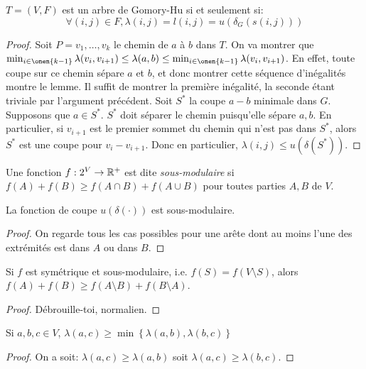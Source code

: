 \documentclass[math, info]{cours}
\begin{document}
\begin{lemme}
	$T = (V, F)$ est un arbre de Gomory-Hu si et seulement si:
	\begin{equation*}
		\forall(i, j) \in F, \lambda(i, j) = l(i, j) = u(\delta_{G}(s(i, j)))
	\end{equation*}
\end{lemme}
\begin{proof}
	Soit $P = v_{1},\ldots, v_{k}$ le chemin de $a$ à $b$ dans $T$.
	On va montrer que $\min_{i \in \onen{k-1}} \lambda(v_{i}, v_{i+1}) \leq \lambda(a, b) \leq \min_{i \in \onen{k - 1}}\lambda(v_{i}, v_{i + 1})$.
	En effet, toute coupe sur ce chemin sépare $a$ et $b$, et donc montrer cette séquence d'inégalités montre le lemme.
	Il suffit de montrer la première inégalité, la seconde étant triviale par l'argument précédent.
	Soit $S^{*}$ la coupe $a-b$ minimale dans $G$. Supposons que $a \in S^{*}$.
	$S^{*}$ doit séparer le chemin puisqu'elle sépare $a, b$. En particulier, si $v_{i + 1}$ est le premier sommet du chemin qui n'est pas dans $S^{*}$, alors $S^{*}$ est une coupe pour $v_{i} - v_{i + 1}$.
	Donc en particulier, $\lambda(i, j) \leq u(\delta(S^{*}))$.
\end{proof}

\begin{definition}
	Une fonction $f : 2^{V} \to \mathbb{R}^{+}$ est dite \emph{sous-modulaire} si $f(A) + f(B) \geq f(A \cap B) + f(A \cup B)$ pour toutes parties $A, B$ de $V$.
	\label{def:submodularfunction}
\end{definition}

\begin{lemme}
	La fonction de coupe $u(\delta(\cdot))$ est sous-modulaire.
\end{lemme}
\begin{proof}
	On regarde tous les cas possibles pour une arête dont au moins l'une des extrémités est dans $A$ ou dans $B$.
\end{proof}

\begin{lemme}
	Si $f$ est symétrique et sous-modulaire, i.e. $f(S) = f(V\setminus S)$, alors $f(A) + f(B) \geq f(A \setminus B) + f(B\setminus A)$.
\end{lemme}
\begin{proof}
	Débrouille-toi, normalien.
\end{proof}

\begin{lemme}
	Si $a, b, c\in V$, $\lambda(a, c) \geq \min \left\{\lambda(a, b), \lambda(b, c)\right\}$
\end{lemme}
\begin{proof}
	On a soit: $\lambda(a, c) \geq \lambda(a, b)$ soit $\lambda(a, c) \geq \lambda(b, c)$.
\end{proof}
\end{document}
